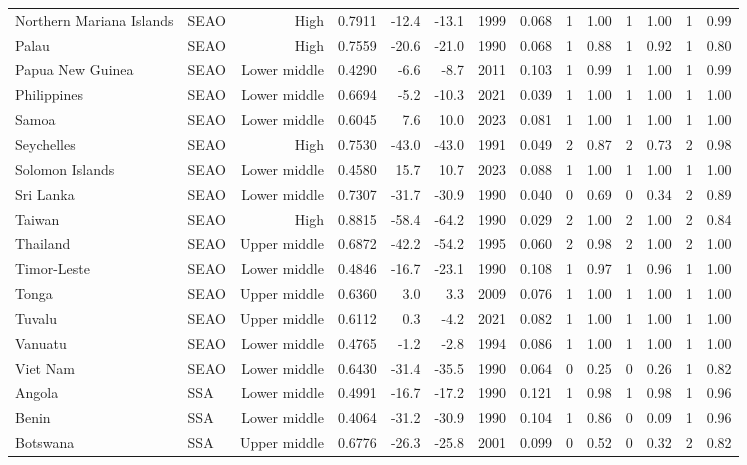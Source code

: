 \begin{longtable}{llrrrrrrrrrrrr}
Northern Mariana Islands & SEAO & High & 0.7911 & -12.4 & -13.1 & 1999 & 0.068 & 1 & 1.00 & 1 & 1.00 & 1 & 0.99 \\
Palau & SEAO & High & 0.7559 & -20.6 & -21.0 & 1990 & 0.068 & 1 & 0.88 & 1 & 0.92 & 1 & 0.80 \\
Papua New Guinea & SEAO & Lower middle & 0.4290 &  -6.6 &  -8.7 & 2011 & 0.103 & 1 & 0.99 & 1 & 1.00 & 1 & 0.99 \\
Philippines & SEAO & Lower middle & 0.6694 &  -5.2 & -10.3 & 2021 & 0.039 & 1 & 1.00 & 1 & 1.00 & 1 & 1.00 \\
Samoa & SEAO & Lower middle & 0.6045 &   7.6 &  10.0 & 2023 & 0.081 & 1 & 1.00 & 1 & 1.00 & 1 & 1.00 \\
Seychelles & SEAO & High & 0.7530 & -43.0 & -43.0 & 1991 & 0.049 & 2 & 0.87 & 2 & 0.73 & 2 & 0.98 \\
Solomon Islands & SEAO & Lower middle & 0.4580 &  15.7 &  10.7 & 2023 & 0.088 & 1 & 1.00 & 1 & 1.00 & 1 & 1.00 \\
Sri Lanka & SEAO & Lower middle & 0.7307 & -31.7 & -30.9 & 1990 & 0.040 & 0 & 0.69 & 0 & 0.34 & 2 & 0.89 \\
Taiwan & SEAO & High & 0.8815 & -58.4 & -64.2 & 1990 & 0.029 & 2 & 1.00 & 2 & 1.00 & 2 & 0.84 \\
Thailand & SEAO & Upper middle & 0.6872 & -42.2 & -54.2 & 1995 & 0.060 & 2 & 0.98 & 2 & 1.00 & 2 & 1.00 \\
Timor-Leste & SEAO & Lower middle & 0.4846 & -16.7 & -23.1 & 1990 & 0.108 & 1 & 0.97 & 1 & 0.96 & 1 & 1.00 \\
Tonga & SEAO & Upper middle & 0.6360 &   3.0 &   3.3 & 2009 & 0.076 & 1 & 1.00 & 1 & 1.00 & 1 & 1.00 \\
Tuvalu & SEAO & Upper middle & 0.6112 &   0.3 &  -4.2 & 2021 & 0.082 & 1 & 1.00 & 1 & 1.00 & 1 & 1.00 \\
Vanuatu & SEAO & Lower middle & 0.4765 &  -1.2 &  -2.8 & 1994 & 0.086 & 1 & 1.00 & 1 & 1.00 & 1 & 1.00 \\
Viet Nam & SEAO & Lower middle & 0.6430 & -31.4 & -35.5 & 1990 & 0.064 & 0 & 0.25 & 0 & 0.26 & 1 & 0.82 \\
Angola & SSA & Lower middle & 0.4991 & -16.7 & -17.2 & 1990 & 0.121 & 1 & 0.98 & 1 & 0.98 & 1 & 0.96 \\
Benin & SSA & Lower middle & 0.4064 & -31.2 & -30.9 & 1990 & 0.104 & 1 & 0.86 & 0 & 0.09 & 1 & 0.96 \\
Botswana & SSA & Upper middle & 0.6776 & -26.3 & -25.8 & 2001 & 0.099 & 0 & 0.52 & 0 & 0.32 & 2 & 0.82 \\

\end{longtable}
